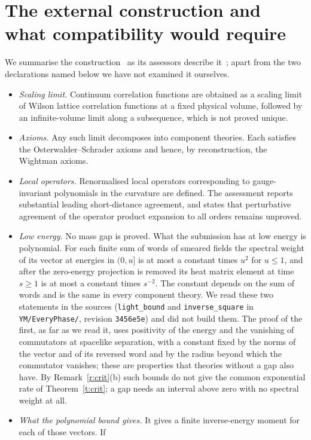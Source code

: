 \section{The external construction and what compatibility would require}\label{s:ext}
We summarise the construction~\cite{OAI} as its assessors describe it~\cite[pp.~1, 3]{YMG}; apart from the two
declarations named below we have not examined it ourselves.
\begin{itemize}
\item \emph{Scaling limit.} Continuum correlation functions are obtained as a scaling limit of Wilson lattice correlation
functions at a fixed physical volume, followed by an infinite-volume limit along a subsequence, which is not
proved unique.
\item \emph{Axioms.} Any such limit decomposes into component theories. Each satisfies the Osterwalder--Schrader axioms and
hence, by reconstruction, the Wightman axioms.
\item \emph{Local operators.} Renormalised local operators corresponding to gauge-invariant polynomials in the curvature are defined.
The assessment reports substantial leading short-distance agreement, and states that perturbative
agreement of the operator product expansion to all orders remains unproved.
\item \emph{Low energy.} No mass gap is proved. What the submission has at low energy is polynomial. For each finite sum of
words of smeared fields the spectral weight of its vector at energies in $(0,u]$ is at most a constant times
$u^2$ for $u\le1$, and after the zero-energy projection is removed its heat matrix element at time $s\ge1$ is at
most a constant times $s^{-2}$. The constant depends on the sum of words and is the same in every component
theory. We read these two statements in the sources (\texttt{light\_bound} and
\texttt{inverse\_square} in \texttt{YM/EveryPhase/}, revision \texttt{3456e5e}) and did not build them. The
proof of the first, as far as we read it, uses positivity of the energy and the vanishing of commutators at
spacelike separation, with a constant fixed by the norms of the vector and of its reversed word and by the
radius beyond which the commutator vanishes; these are properties that theories without a gap also have. By
Remark~\ref{r:crit}(b) such bounds do not give the common exponential rate of Theorem~\ref{t:crit}; a gap
needs an interval above zero with no spectral weight at all.
\item \emph{What the polynomial bound gives.} It gives a finite inverse-energy moment for each of those vectors. If

\end{itemize}
